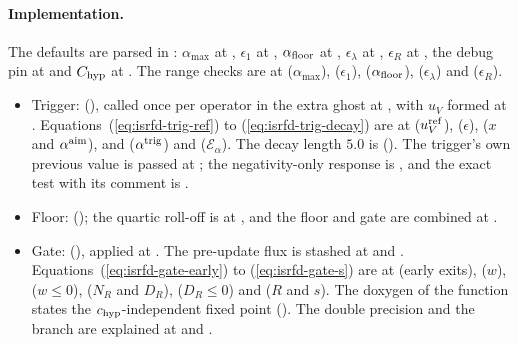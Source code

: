 \paragraph{Implementation.} The defaults are parsed in
: $\alpha_{\max}$ at
, $\epsilon_1$
at , $\alpha_{\rm floor}$ at , $\epsilon_\lambda$
at , $\epsilon_R$ at , the debug pin at
 and $C_{\rm hyp}$ at . The range checks are at
 ($\alpha_{\max}$), 
($\epsilon_1$),  ($\alpha_{\rm floor}$), 
($\epsilon_\lambda$) and  ($\epsilon_R$).
\begin{itemize}
  \item Trigger: 
    (), called once per operator in the extra
    ghost at , with $u_V$ formed at
    . Equations~(\ref{eq:isrfd-trig-ref}) to
    (\ref{eq:isrfd-trig-decay}) are at 
    ($u_V^{\rm ref}$),  ($\epsilon$),  ($x$ and
    $\alpha^{\rm aim}$),  and  ($\alpha^{\rm trig}$) and
     ($\mathcal{E}_\alpha$). The decay length $5.0$ is
     ().
    The trigger's own previous value is passed at ;
    the negativity-only response is , and the
    exact test with its comment is .
  \item Floor: 
    (); the quartic roll-off is at
    , and the floor and gate are combined at
    .
  \item Gate: 
    (), applied at
    . The pre-update flux is stashed at
     and .
    Equations~(\ref{eq:isrfd-gate-early}) to (\ref{eq:isrfd-gate-s}) are at
     (early exits),  ($w$),
     ($w \le 0$),  ($N_R$ and $D_R$), 
    ($D_R \le 0$) and  ($R$ and $s$). The doxygen of the function
    states the $c_{\rm hyp}$-independent fixed point
    (). The double precision and the branch are
    explained at  and .
\end{itemize}

